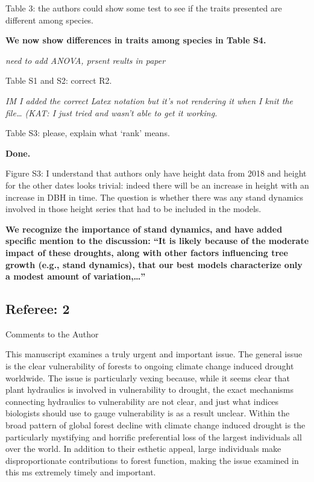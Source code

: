\documentclass[
]{article}
\begin{document}
Table 3: the authors could show some test to see if the traits presented
are different among species.

\textbf{We now show differences in traits among species in Table S4.}

\emph{need to add ANOVA, prsent reults in paper}

Table S1 and S2: correct R2.

\emph{IM I added the correct Latex notation but it's not rendering it
when I knit the file\ldots{} (KAT: I just tried and wasn't able to get
it working.}

Table S3: please, explain what `rank' means.

\textbf{Done.}

Figure S3: I understand that authors only have height data from 2018 and
height for the other dates looks trivial: indeed there will be an
increase in height with an increase in DBH in time. The question is
whether there was any stand dynamics involved in those height series
that had to be included in the models.

\textbf{We recognize the importance of stand dynamics, and have added
specific mention to the discussion: ``It is likely because of the
moderate impact of these droughts, along with other factors influencing
tree growth (e.g., stand dynamics), that our best models characterize
only a modest amount of variation,\ldots{}''}

\hypertarget{referee-2}{%
\subsection{Referee: 2}\label{referee-2}}

Comments to the Author

This manuscript examines a truly urgent and important issue. The general
issue is the clear vulnerability of forests to ongoing climate change
induced drought worldwide. The issue is particularly vexing because,
while it seems clear that plant hydraulics is involved in vulnerability
to drought, the exact mechanisms connecting hydraulics to vulnerability
are not clear, and just what indices biologists should use to gauge
vulnerability is as a result unclear. Within the broad pattern of global
forest decline with climate change induced drought is the particularly
mystifying and horrific preferential loss of the largest individuals all
over the world. In addition to their esthetic appeal, large individuals
make disproportionate contributions to forest function, making the issue
examined in this ms extremely timely and important.
\end{document}
